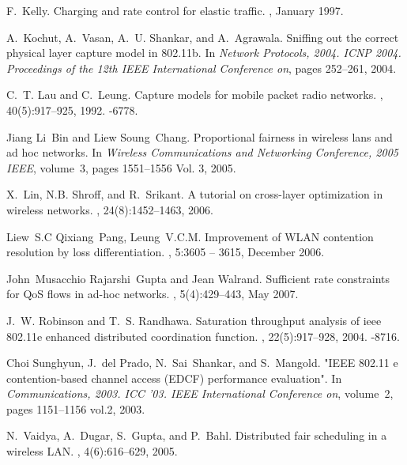 \documentclass[letterpaper, 10 pt, conference]{ieeeconf}
\begin{document}
\begin{thebibliography}{10}
F.~Kelly.
\newblock Charging and rate control for elastic traffic.
, January
  1997.

A.~Kochut, A.~Vasan, A.~U. Shankar, and A.~Agrawala.
\newblock Sniffing out the correct physical layer capture model in 802.11b.
\newblock In {\em Network Protocols, 2004. ICNP 2004. Proceedings of the 12th
  IEEE International Conference on}, pages 252--261, 2004.

C.~T. Lau and C.~Leung.
\newblock Capture models for mobile packet radio networks.
, 40(5):917--925, 1992.
-6778.

Jiang Li~Bin and Liew Soung~Chang.
\newblock Proportional fairness in wireless lans and ad hoc networks.
\newblock In {\em Wireless Communications and Networking Conference, 2005
  IEEE}, volume~3, pages 1551--1556 Vol. 3, 2005.

X.~Lin, N.B. Shroff, and R.~Srikant.
\newblock A tutorial on cross-layer optimization in wireless networks.
,
  24(8):1452--1463, 2006.

Liew~S.C Qixiang~Pang, Leung~V.C.M.
\newblock Improvement of {WLAN} contention resolution by loss differentiation.
, 5:3605 -- 3615,
  December 2006.

John~Musacchio Rajarshi~Gupta and Jean Walrand.
\newblock Sufficient rate constraints for {QoS} flows in ad-hoc networks.
, 5(4):429--443, May 2007.

J.~W. Robinson and T.~S. Randhawa.
\newblock Saturation throughput analysis of ieee 802.11e enhanced distributed
  coordination function.
,
  22(5):917--928, 2004.
-8716.

Choi Sunghyun, J.~del Prado, N.~Sai~Shankar, and S.~Mangold.
\newblock "{IEEE} 802.11 e contention-based channel access ({EDCF}) performance
  evaluation".
\newblock In {\em Communications, 2003. ICC '03. IEEE International Conference
  on}, volume~2, pages 1151--1156 vol.2, 2003.

N.~Vaidya, A.~Dugar, S.~Gupta, and P.~Bahl.
\newblock Distributed fair scheduling in a wireless {LAN}.
, 4(6):616--629, 2005.

\end{thebibliography}
\end{document}
